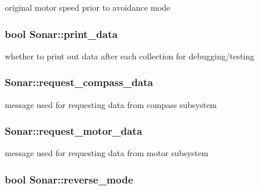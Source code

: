 original motor speed prior to avoidance mode \hypertarget{classSonar_ac9ab4c77456aea18ac1eb886a5c81f4c}{
\subsubsection[{print\-\_\-data}]{\setlength{\rightskip}{0pt plus 5cm}bool Sonar\-::print\-\_\-data\hspace{0.3cm}{\ttfamily [protected]}}}\label{classSonar_ac9ab4c77456aea18ac1eb886a5c81f4c}
whether to print out data after each collection for debugging/testing \hypertarget{classSonar_a560057581920d76e557880135548ce46}{
\subsubsection[{request\-\_\-compass\-\_\-data}]{ Sonar\-::request\-\_\-compass\-\_\-data\hspace{0.3cm}{\ttfamily [protected]}}}\label{classSonar_a560057581920d76e557880135548ce46}
message used for requesting data from compass subsystem \hypertarget{classSonar_a5326194659d6f29efa21b6eae03f6a4e}{
\subsubsection[{request\-\_\-motor\-\_\-data}]{ Sonar\-::request\-\_\-motor\-\_\-data\hspace{0.3cm}{\ttfamily [protected]}}}\label{classSonar_a5326194659d6f29efa21b6eae03f6a4e}
message used for requesting data from motor subsystem \hypertarget{classSonar_ad9f288f52d8d26a687a557c714d6f026}{
\subsubsection[{reverse\-\_\-mode}]{\setlength{\rightskip}{0pt plus 5cm}bool Sonar\-::reverse\-\_\-mode\hspace{0.3cm}{\ttfamily [protected]}}}\label{classSonar_ad9f288f52d8d26a687a557c714d6f026}
